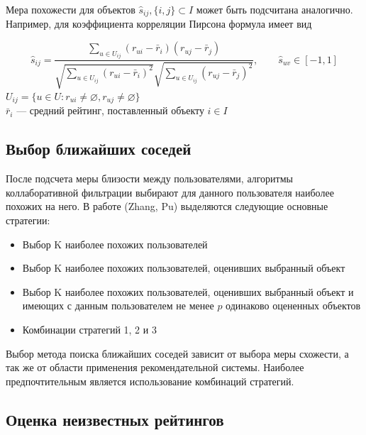\documentclass[a4paper, 12pt]{article} %
\begin{document}
Мера похожести для объектов $\hat{s}_{ij}, \{i, j\} \subset I$ может быть подсчитана аналогично. Например, для коэффициента корреляции Пирсона формула имеет вид

\[
	\hat{s}_{ij} = \frac{\sum_{u \in U_{ij}} (r_{ui} - \bar{r}_{i})(r_{uj} - \bar{r}_{j})}{\sqrt{\sum_{u \in U_{ij}}  (r_{ui} - \bar{r}_{i})^2} \sqrt{\sum_{u \in U_{ij}}  (r_{uj} - \bar{r}_{j})^2}},\qquad \hat{s}_{uv} \in [-1, 1]
\]
\noindent
$U_{ij} = \{u \in U: r_{ui} \neq  \varnothing, r_{uj} \neq \varnothing\}$ 
\\
$\bar{r}_{i}$ --- средний рейтинг, поставленный объекту $i \in I$ 
\\ 


\subsection{Выбор ближайших соседей}
После подсчета меры близости между пользователями, алгоритмы коллаборативной фильтрации выбирают  для данного пользователя наиболее похожих на него. В работе (Zhang, Pu)\cite{neighbourhoodselection} выделяются следующие основные стратегии:
\begin{itemize}

\item Выбор K наиболее похожих пользователей

\item Выбор K наиболее похожих пользователей, оценивших выбранный объект

\item Выбор K наиболее похожих пользователей, оценивших выбранный объект и имеющих с данным пользователем не менее $p$ одинаково оцененных объектов

\item Комбинации стратегий 1, 2 и 3

\end{itemize}

Выбор метода поиска ближайших соседей зависит от выбора меры схожести, а так же от области применения рекомендательной системы. Наиболее предпочтительным является использование комбинаций стратегий.


\subsection{Оценка неизвестных рейтингов}
\end{document}

